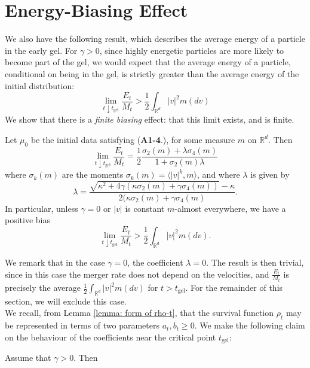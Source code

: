 \section{Energy-Biasing Effect} 
We also have the following result, which describes the average energy of a particle in the early gel. For $\gamma >0$, since highly energetic particles are more likely to become part of the gel, we would expect that the average energy of a particle, conditional on being in the gel, is strictly greater than the average energy of the initial distribution: \begin{equation}
    \lim_{t\downarrow t_\mathrm{gel}}\frac{E_t}{M_t}>\frac{1}{2}\int_{\mathbb{R}^d}|v|^2m(dv)
\end{equation} We show that there is a \emph{finite biasing} effect: that this limit exists, and is finite. 
\begin{theorem} Let $\mu_0$ be the initial data satisfying (\textbf{A1-4}.), for some measure $m$ on $\mathbb{R}^d$. Then \begin{equation}
    \lim_{t\downarrow t_\mathrm{gel}}\frac{E_t}{M_t}=\frac{1}{2}\frac{\sigma_2(m)+\lambda\sigma_4(m)}{1+\sigma_2(m)\lambda}
\end{equation} where $\sigma_k(m)$ are the moments $\sigma_k(m)=\langle |v|^k, m\rangle$, and where $\lambda$ is given by \begin{equation} \lambda=\frac{\sqrt{\kappa^2+4\gamma(\kappa\sigma_2(m)+\gamma \sigma_4(m))}-\kappa}{2(\kappa\sigma_2(m)+\gamma\sigma_4(m)}.\end{equation} In particular, unless $\gamma=0$ or $|v|$ is constant $m$-almost everywhere, we have a positive bias \begin{equation}
    \lim_{t\downarrow t_\mathrm{gel}}\frac{E_t}{M_t}>\frac{1}{2}\int_{\mathbb{R}^d}|v|^2m(dv).
\end{equation} \end{theorem}  We remark that in the case $\gamma=0$, the coefficient $\lambda=0$. The result is then trivial, since in this case the merger rate does not depend on the velocities, and $\frac{E_t}{M_t}$ is precisely the average $\frac{1}{2}\int_{\mathbb{R}^d}|v|^2m(dv)$ for $t>t_\mathrm{gel}$. For the remainder of this section, we will exclude this case. \medskip \\We recall, from Lemma \ref{lemma: form of rho-t}, that the survival function $\rho_t$ may be represented in terms of two parameters $a_t, b_t \ge 0$. We make the following claim on the behaviour of the coefficients near the critical point $t_\mathrm{gel}$: \begin{lemma}\label{lemma: a and b}Assume that $\gamma>0$. Then \begin{enumerate}[label=\roman{*}).]

\end{enumerate}
\end{lemma}
